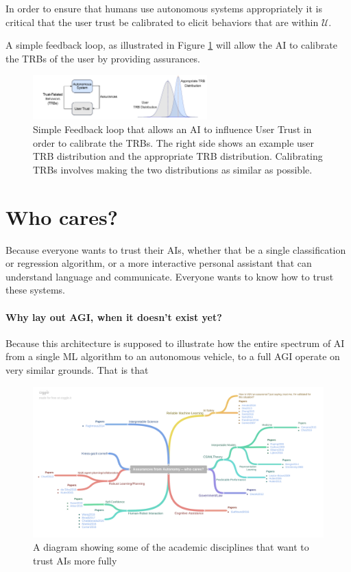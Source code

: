     In order to ensure that humans use autonomous systems appropriately it is critical that the user trust be calibrated to elicit behaviors that are within $\mathcal{U}$.

    A simple feedback loop, as illustrated in Figure \ref{fig:SimpleTrust} will allow the AI to calibrate the TRBs of the user by providing assurances.

	\begin{figure}[htbp]
    	\centering
     	\includegraphics[width=0.6\textwidth]{Figures/SimpleTrust}
    	\caption{Simple Feedback loop that allows an AI to influence User Trust in order to calibrate the TRBs. The right side shows an example user TRB distribution and the appropriate TRB distribution. Calibrating TRBs involves making the two distributions as similar as possible.}
        \label{fig:SimpleTrust}
    \end{figure}

\section{Who cares?}
    Because everyone wants to trust their AIs, whether that be a single classification or regression algorithm, or a more interactive personal assistant that can understand language and communicate. Everyone wants to know how to trust these systems.  

    \paragraph{Why lay out AGI, when it doesn't exist yet?} Because this architecture is supposed to illustrate how the entire spectrum of AI from a single ML algorithm to an autonomous vehicle, to a full AGI operate on very similar grounds. That is that 

	\begin{figure}
        \centering
    	\includegraphics[width=8in]{Figures/WhoCares}
    	\caption{A diagram showing some of the academic disciplines that want to trust AIs more fully}
        \label{fig:WhoCares}
    \end{figure}

